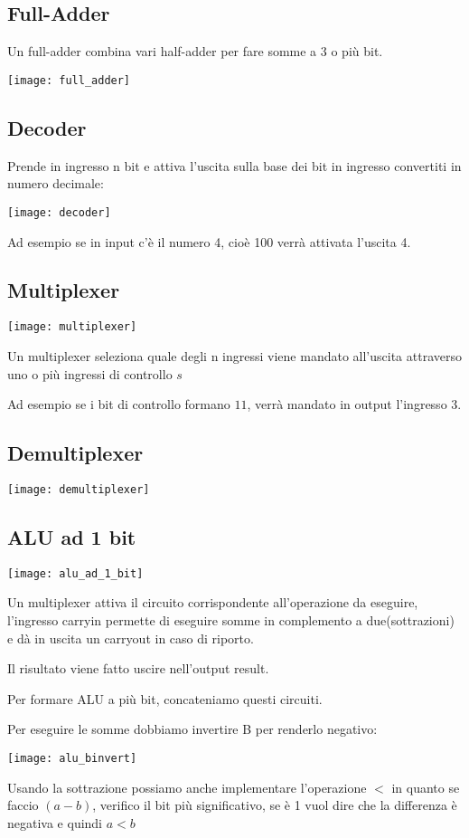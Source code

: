 \documentclass[a4paper]{article}
\begin{document}
\subsection{Full-Adder}

Un full-adder combina vari half-adder per fare somme a 3 o più bit.

\texttt{[image: full\_adder]}

\subsection{Decoder}

Prende in ingresso n bit e attiva l'uscita sulla base dei bit in ingresso convertiti in numero decimale:

\texttt{[image: decoder]}

Ad esempio se in input c'è il numero 4, cioè 100 verrà attivata l'uscita 4.

\subsection{Multiplexer}

\texttt{[image: multiplexer]}

Un multiplexer seleziona quale degli n ingressi viene mandato all'uscita attraverso uno o più ingressi di controllo $s$

Ad esempio se i bit di controllo formano $11$, verrà mandato in output l'ingresso 3.

\subsection{Demultiplexer}

\texttt{[image: demultiplexer]}

\subsection{ALU ad 1 bit}

\texttt{[image: alu\_ad\_1\_bit]}

Un multiplexer attiva il circuito corrispondente all'operazione da eseguire, l'ingresso carryin permette di eseguire somme in complemento a due(sottrazioni) e dà in uscita un carryout in caso di riporto.

Il risultato viene fatto uscire nell'output result.

Per formare ALU a più bit, concateniamo questi circuiti.

Per eseguire le somme dobbiamo invertire B per renderlo negativo:

\texttt{[image: alu\_binvert]}

Usando la sottrazione possiamo anche implementare l'operazione $<$ in quanto se faccio $(a-b)$, verifico il bit più significativo, se è 1 vuol dire che la differenza è negativa e quindi $a < b$
\end{document}
